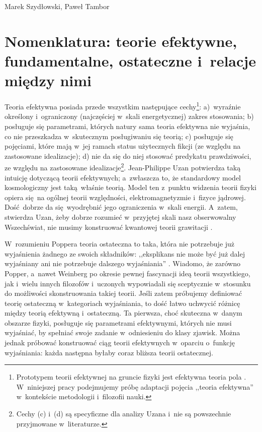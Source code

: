 \begin{artplenv2auth}{Marek Szydłowski, Paweł Tambor}
\section{Nomenklatura: teorie efektywne, fundamentalne, ostateczne i~relacje między nimi}
Teoria efektywna posiada przede wszystkim następujące cechy\footnote{Prototypem teorii efektywnej na gruncie fizyki jest efektywna teoria pola
\parencites[][]{kim_wilson_1998}[][]{wilson_renormalization_1971}. %
 W~niniejszej pracy podejmujemy próbę adaptacji pojęcia ,,teoria efektywna'' w~kontekście metodologii i~filozofii nauki.}:
 a)~wyraźnie określony i~ograniczony (najczęściej w~skali energetycznej) zakres stosowania; b) posługuje się parametrami, których natury sama teoria efektywna nie wyjaśnia, co nie przeszkadza w~skutecznym posługiwaniu się teorią; c) posługuje się pojęciami, które mają w~jej ramach status użytecznych fikcji (ze względu na zastosowane idealizacje); d) nie da się do niej stosować predykatu prawdziwości, ze względu na zastosowane idealizacje\footnote{Cechy (c) i~(d) są specyficzne dla analizy Uzana i~nie są powszechnie przyjmowane w~literaturze.}. Jean-Philippe Uzan potwierdza taką intuicję dotyczącą teorii efektywnych; a~zwłaszcza to, że standardowy model kosmologiczny jest taką~właśnie teorią. Model ten z~punktu widzenia teorii fizyki opiera się~na ogólnej teorii względności, elektromagnetyzmie i~fizyce jądrowej. Dość~dobrze da się~wyodrębnić jego ograniczenia w~skali energii. A~zatem, stwierdza Uzan, żeby dobrze rozumieć w~przyjętej skali nasz obserwowalny Wszechświat, nie musimy konstruować kwantowej teorii grawitacji 
\parencite[][s.~109]{uzan_emergent_2017}.%


W~rozumieniu Poppera teoria ostateczna to taka, która nie potrzebuje już wyjaśnienia żadnego ze swoich składników: ,,eksplikans nie może być już dalej wyjaśniany ani nie potrzebuje dalszego wyjaśniania''
\parencite[][s.~159]{popper_wiedza_2002}. %
 Wiadomo, że zarówno Popper, a~nawet Weinberg po okresie pewnej fascynacji ideą teorii wszystkiego, jak i~wielu innych filozofów i~uczonych wypowiadali się sceptycznie w~stosunku do możliwości skonstruowania takiej teorii. Jeśli zatem próbujemy definiować teorię ostateczną w~kategoriach wyjaśniania, to dość łatwo uchwycić różnicę między teorią efektywną i~ostateczną. Ta pierwsza, choć skuteczna w~danym obszarze fizyki, posługuje się parametrami efektywnymi, których nie musi wyjaśniać, by spełniać swoje zadanie w~odniesieniu do klasy zjawisk. Można jednak próbować konstruować ciąg teorii efektywnych w~oparciu o~funkcję wyjaśniania: każda następna byłaby coraz bliższa teorii ostatecznej.


\end{artplenv2auth}
